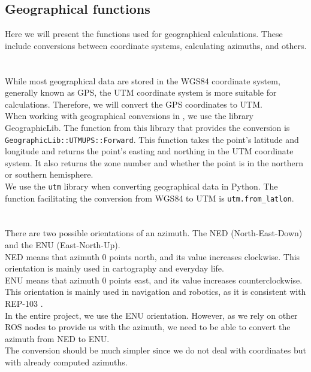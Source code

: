     \subsection{Geographical functions}
    \label{sec:geo_func}
        Here we will present the functions used for geographical calculations. These include conversions between coordinate systems, calculating azimuths, and others.\\\\
        \\
            While most geographical data are stored in the WGS84 coordinate system, generally known as GPS, the UTM coordinate system is more suitable for calculations. Therefore, we will convert the GPS coordinates to UTM.\\
            When working with geographical conversions in \CC, we use the library GeographicLib. The function from this library that provides the conversion is \texttt{GeographicLib::UTMUPS::Forward}. This function takes the point's latitude and longitude and returns the point's easting and northing in the UTM coordinate system. It also returns the zone number and whether the point is in the northern or southern hemisphere.\\
            We use the \texttt{utm} library when converting geographical data in Python. The function facilitating the conversion from WGS84 to UTM is \texttt{utm.from\_latlon}.\\\\
        \\
            There are two possible orientations of an azimuth. The NED (North-East-Down) and the ENU (East-North-Up).\\
            NED means that azimuth 0 points north, and its value increases clockwise. This orientation is mainly used in cartography and everyday life.\\
            ENU means that azimuth 0 points east, and its value increases counterclockwise. This orientation is mainly used in navigation and robotics, as it is consistent with REP-103 \cite{REP-103}.\\
            In the entire project, we use the ENU orientation. However, as we rely on other ROS nodes to provide us with the azimuth, we need to be able to convert the azimuth from NED to ENU.\\
            The conversion should be much simpler since we do not deal with coordinates but with already computed azimuths.\\
